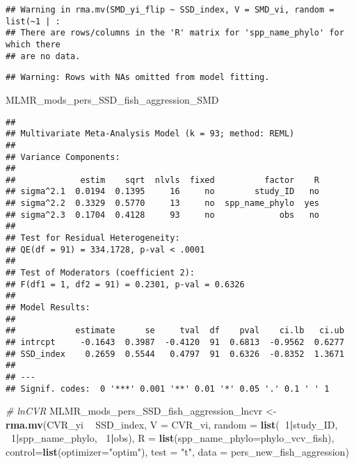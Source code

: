 \documentclass[]{article}
\newenvironment{Shaded}{\begin{snugshade}}{\end{snugshade}}
\newcommand{\KeywordTok}[1]{\textcolor[rgb]{0.13,0.29,0.53}{\textbf{#1}}}
\newcommand{\DataTypeTok}[1]{\textcolor[rgb]{0.13,0.29,0.53}{#1}}
\newcommand{\DecValTok}[1]{\textcolor[rgb]{0.00,0.00,0.81}{#1}}
\newcommand{\StringTok}[1]{\textcolor[rgb]{0.31,0.60,0.02}{#1}}
\newcommand{\CommentTok}[1]{\textcolor[rgb]{0.56,0.35,0.01}{\textit{#1}}}
\newcommand{\OperatorTok}[1]{\textcolor[rgb]{0.81,0.36,0.00}{\textbf{#1}}}
\newcommand{\NormalTok}[1]{#1}
\begin{document}
\begin{verbatim}
## Warning in rma.mv(SMD_yi_flip ~ SSD_index, V = SMD_vi, random = list(~1 | :
## There are rows/columns in the 'R' matrix for 'spp_name_phylo' for which there
## are no data.
\end{verbatim}

\begin{verbatim}
## Warning: Rows with NAs omitted from model fitting.
\end{verbatim}

\begin{Shaded}
\begin{Highlighting}[]
\NormalTok{    MLMR_mods_pers_SSD_fish_aggression_SMD}
\end{Highlighting}
\end{Shaded}

\begin{verbatim}
## 
## Multivariate Meta-Analysis Model (k = 93; method: REML)
## 
## Variance Components:
## 
##             estim    sqrt  nlvls  fixed          factor    R 
## sigma^2.1  0.0194  0.1395     16     no        study_ID   no 
## sigma^2.2  0.3329  0.5770     13     no  spp_name_phylo  yes 
## sigma^2.3  0.1704  0.4128     93     no             obs   no 
## 
## Test for Residual Heterogeneity:
## QE(df = 91) = 334.1728, p-val < .0001
## 
## Test of Moderators (coefficient 2):
## F(df1 = 1, df2 = 91) = 0.2301, p-val = 0.6326
## 
## Model Results:
## 
##            estimate      se     tval  df    pval    ci.lb   ci.ub 
## intrcpt     -0.1643  0.3987  -0.4120  91  0.6813  -0.9562  0.6277    
## SSD_index    0.2659  0.5544   0.4797  91  0.6326  -0.8352  1.3671    
## 
## ---
## Signif. codes:  0 '***' 0.001 '**' 0.01 '*' 0.05 '.' 0.1 ' ' 1
\end{verbatim}

\begin{Shaded}
\begin{Highlighting}[]
    \CommentTok{# lnCVR}
\NormalTok{      MLMR_mods_pers_SSD_fish_aggression_lncvr <-}\StringTok{ }\KeywordTok{rma.mv}\NormalTok{(CVR_yi }\OperatorTok{~}\StringTok{ }\NormalTok{SSD_index, }\DataTypeTok{V =}\NormalTok{ CVR_vi, }
                                            \DataTypeTok{random =} \KeywordTok{list}\NormalTok{(}\OperatorTok{~}\DecValTok{1}\OperatorTok{|}\NormalTok{study_ID, }\OperatorTok{~}\DecValTok{1}\OperatorTok{|}\NormalTok{spp_name_phylo, }\OperatorTok{~}\DecValTok{1}\OperatorTok{|}\NormalTok{obs), }
                                            \DataTypeTok{R =} \KeywordTok{list}\NormalTok{(}\DataTypeTok{spp_name_phylo=}\NormalTok{phylo_vcv_fish), }\DataTypeTok{control=}\KeywordTok{list}\NormalTok{(}\DataTypeTok{optimizer=}\StringTok{"optim"}\NormalTok{), }
                                            \DataTypeTok{test =} \StringTok{"t"}\NormalTok{, }\DataTypeTok{data =}\NormalTok{ pers_new_fish_aggression)}
\end{Highlighting}
\end{Shaded}
\end{document}

